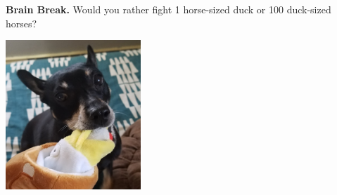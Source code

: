 \documentclass{beamer}
\newcommand{\fn}{\insertframenumber}
\theoremstyle{definition}
\newtheorem{exercise}{Exercise}
\newtheorem*{exa}{Example}
\newtheorem*{recall}{Recall}
\begin{document}
\begin{frame}{\fn}
	\begin{block}{\textbf{Brain Break.}}
		Would you rather fight 1 horse-sized duck or 100 duck-sized horses?
		\begin{center}
			\includegraphics[width=2in]{images/turducken_Pepper}
		\end{center}
	\end{block}
\end{frame}
%		
\end{document}
